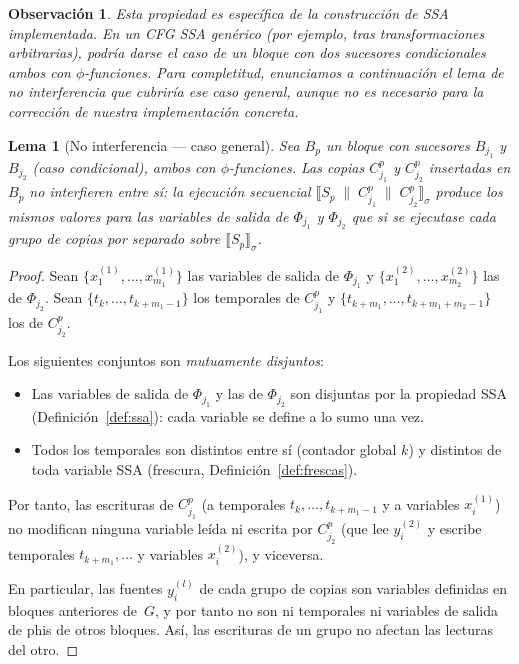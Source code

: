 \documentclass[12pt, a4paper]{article}
\newtheorem{lemma}{Lema}[section]
\newtheorem{remark}{Observación}[section]
\begin{document}
\begin{remark}
Esta propiedad es específica de la construcción de SSA implementada. En un CFG SSA
genérico (por ejemplo, tras transformaciones arbitrarias), podría darse el caso de un
bloque con dos sucesores condicionales ambos con $\phi$-funciones. Para completitud,
enunciamos a continuación el lema de no interferencia que cubriría ese caso general,
aunque no es necesario para la corrección de nuestra implementación concreta.
\end{remark}

\begin{lemma}[No interferencia --- caso general]
\label{lem:no-interference}
Sea $B_p$ un bloque con sucesores $B_{j_1}$ y $B_{j_2}$ (caso condicional), ambos con
$\phi$-funciones. Las copias $C_{j_1}^p$ y $C_{j_2}^p$ insertadas en $B_p$ no interfieren
entre sí: la ejecución secuencial
$\llbracket S_p \;\|\; C_{j_1}^p \;\|\; C_{j_2}^p \rrbracket_\sigma$
produce los mismos valores para las variables de salida de $\Phi_{j_1}$ y $\Phi_{j_2}$ que
si se ejecutase cada grupo de copias por separado sobre $\llbracket S_p \rrbracket_\sigma$.
\end{lemma}

\begin{proof}
Sean $\{x_1^{(1)}, \ldots, x_{m_1}^{(1)}\}$ las variables de salida de $\Phi_{j_1}$ y
$\{x_1^{(2)}, \ldots, x_{m_2}^{(2)}\}$ las de $\Phi_{j_2}$. Sean
$\{t_k, \ldots, t_{k+m_1-1}\}$ los temporales de $C_{j_1}^p$ y
$\{t_{k+m_1}, \ldots, t_{k+m_1+m_2-1}\}$ los de $C_{j_2}^p$.

Los siguientes conjuntos son \emph{mutuamente disjuntos}:
\begin{itemize}
  \item Las variables de salida de $\Phi_{j_1}$ y las de $\Phi_{j_2}$ son disjuntas por la
    propiedad SSA (Definición~\ref{def:ssa}): cada variable se define a lo sumo una vez.
  \item Todos los temporales son distintos entre sí (contador global $k$) y distintos de toda
    variable SSA (frescura, Definición~\ref{def:frescas}).
\end{itemize}

Por tanto, las escrituras de $C_{j_1}^p$ (a temporales $t_k, \ldots, t_{k+m_1-1}$ y a variables
$x^{(1)}_i$) no modifican ninguna variable leída ni escrita por $C_{j_2}^p$ (que lee
$y^{(2)}_i$ y escribe temporales $t_{k+m_1}, \ldots$ y variables $x^{(2)}_i$), y viceversa.

En particular, las fuentes $y_i^{(l)}$ de cada grupo de copias son variables definidas en
bloques anteriores de~$G$, y por tanto no son ni temporales ni variables de salida de phis
de otros bloques. Así, las escrituras de un grupo no afectan las lecturas del otro.
\end{proof}
\end{document}
